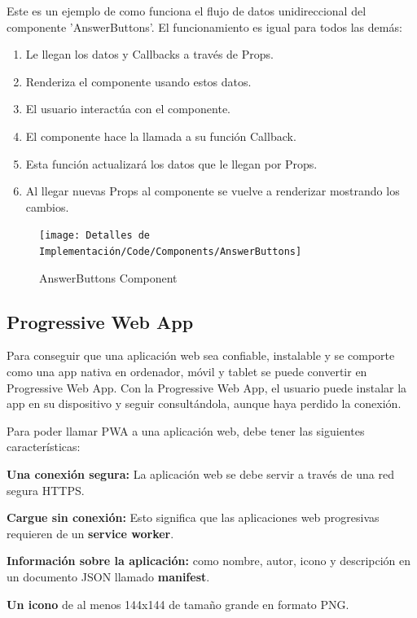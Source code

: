 \documentclass[12pt,twoside,titlepage]{report}
\begin{document}
Este es un ejemplo de como funciona el flujo de datos unidireccional del componente 'AnswerButtons'. El funcionamiento es igual para todos las demás: 

\begin{enumerate}
    \item Le llegan los datos y Callbacks a través de Props.
    \item Renderiza el componente usando estos datos.
    \item El usuario interactúa con el componente.
    \item El componente hace la llamada a su función Callback.
    \item Esta función actualizará los datos que le llegan por Props.
    \item Al llegar nuevas Props al componente se vuelve a renderizar mostrando los cambios.
\end{enumerate}

\begin{figure}[H]
    \centering
    \texttt{[image: Detalles de Implementación/Code/Components/AnswerButtons]}
    \label{fig:AnswerButtons}
    \caption{AnswerButtons Component}
\end{figure}

\subsection{Progressive Web App}
Para conseguir que una aplicación web sea confiable, instalable y se comporte como una app nativa en ordenador, móvil y tablet se puede convertir en Progressive Web App. Con la Progressive Web App, el usuario puede instalar la app en su dispositivo y seguir consultándola, aunque haya perdido la conexión.

Para poder llamar PWA a una aplicación web, debe tener las siguientes características:

\begin{compactitem}

    \item \textbf{Una conexión segura:} La aplicación web se debe servir a través de una red segura HTTPS.
    \item \textbf{Cargue sin conexión:} Esto significa que las aplicaciones web progresivas requieren de un \textbf{service worker}.
    \item \textbf{Información sobre la aplicación:} como nombre, autor, icono y descripción en un documento JSON llamado \textbf{manifest}.
    \item \textbf{Un icono} de al menos 144x144 de tamaño grande en formato PNG.
\end{compactitem}
\end{document}
